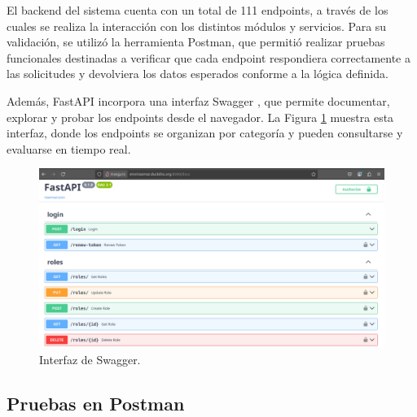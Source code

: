 El backend del sistema cuenta con un total de 111 endpoints, a través de los
cuales se realiza la interacción con los distintos módulos y servicios. Para su
validación, se utilizó la herramienta Postman, que permitió realizar pruebas
funcionales destinadas a verificar que cada endpoint respondiera correctamente
a las solicitudes y devolviera los datos esperados conforme a la lógica
definida.



Además, FastAPI incorpora una interfaz Swagger \cite{SwaggerIO}, que permite
documentar, explorar y probar los endpoints desde el navegador. La Figura
\ref{fig:swagger} muestra esta interfaz, donde los endpoints se organizan por
categoría y pueden consultarse y evaluarse en tiempo real.

\begin{figure}[H]
    \centering
    \includegraphics[width=\textwidth]{Images/37_swagger.png}
    \caption[Interfaz de Swagger]{Interfaz de Swagger.}
    \label{fig:swagger}
\end{figure}

\subsection{Pruebas en Postman}

